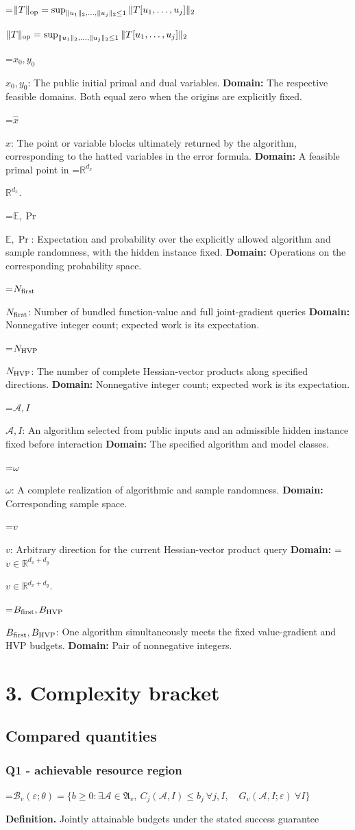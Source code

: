 \documentclass[10pt,a4paper]{article}
\newcommand{\AtlasMath}[1]{\par\begingroup\centering\setbox0=\hbox{$\displaystyle #1$}\ifdim\wd0>1.4\linewidth\typeout{ATLAS WIDE FORMULA: \the\wd0}\fi\ifdim\wd0>\linewidth\resizebox{\linewidth}{!}{\box0}\else\box0\fi\par\endgroup}
\newcommand{\AtlasInlineMath}[1]{\begingroup\setbox0=\hbox{$#1$}\ifdim\wd0>.4\linewidth\endgroup\AtlasMath{#1}\else\endgroup$#1$\fi}
\begin{document}
\AtlasInlineMath{\|T\|_{\rm op}=\sup_{\|u_1\|_2,\ldots,\|u_j\|_2\le1}\|T[u_1,\ldots,u_j]\|_2}

\AtlasInlineMath{x_0,y_0}: The public initial primal and dual variables. \textbf{Domain:} The respective feasible domains. Both equal zero when the origins are explicitly fixed.

\AtlasInlineMath{\widehat x}: The point or variable blocks ultimately returned by the algorithm, corresponding to the hatted variables in the error formula. \textbf{Domain:} A feasible primal point in \AtlasInlineMath{\mathbb R^{d_x}}.

\AtlasInlineMath{\mathbb E,\Pr}: Expectation and probability over the explicitly allowed algorithm and sample randomness, with the hidden instance fixed. \textbf{Domain:} Operations on the corresponding probability space.

\AtlasInlineMath{N_{\rm first}}: Number of bundled function-value and full joint-gradient queries \textbf{Domain:} Nonnegative integer count; expected work is its expectation.

\AtlasInlineMath{N_{\rm HVP}}: The number of complete Hessian-vector products along specified directions. \textbf{Domain:} Nonnegative integer count; expected work is its expectation.

\AtlasInlineMath{\mathcal A,I}: An algorithm selected from public inputs and an admissible hidden instance fixed before interaction \textbf{Domain:} The specified algorithm and model classes.

\AtlasInlineMath{\omega}: A complete realization of algorithmic and sample randomness. \textbf{Domain:} Corresponding sample space.

\AtlasInlineMath{v}: Arbitrary direction for the current Hessian-vector product query \textbf{Domain:} \AtlasInlineMath{v\in\mathbb R^{d_x+d_y}}.

\AtlasInlineMath{B_{\rm first},B_{\rm HVP}}: One algorithm simultaneously meets the fixed value-gradient and HVP budgets. \textbf{Domain:} Pair of nonnegative integers.

\section{3. Complexity bracket}
\subsection{Compared quantities}
\subsubsection{Q1 - achievable resource region}
\AtlasMath{\mathcal B_v(\varepsilon;\theta)=\{b\ge0:\exists\mathcal A\in\mathfrak A_v,\ C_j(\mathcal A,I)\le b_j\ \forall j,I,\quad G_v(\mathcal A,I;\varepsilon)\ \forall I\}}
\textbf{Definition.} Jointly attainable budgets under the stated success guarantee
\end{document}
